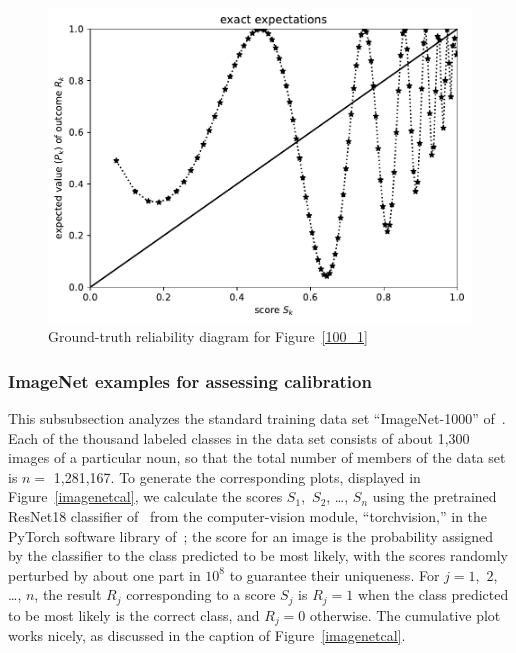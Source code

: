 \documentclass{article}
\begin{document}
\begin{figure}
\begin{centering}

\parbox{\imsize}{\includegraphics[width=\imsize]
                {./codes/unweighted/100_4_2_1/exact.pdf}}

\end{centering}
\caption{Ground-truth reliability diagram for Figure~\ref{100_1}}
\label{100_1e}
\end{figure}



\subsubsection{ImageNet examples for assessing calibration}
\label{aimagenetex}

This subsubsection analyzes the standard training data set ``ImageNet-1000''
of~\cite{imagenet}. Each of the thousand labeled classes in the data set
consists of about 1,300 images of a particular noun,
so that the total number of members of the data set is $n =$ 1,281,167.
To generate the corresponding plots, displayed in Figure~\ref{imagenetcal},
we calculate the scores $S_1$,~$S_2$, \dots, $S_n$
using the pretrained ResNet18 classifier of~\cite{he-zhang-ren-sun}
from the computer-vision module, ``torchvision,''
in the PyTorch software library of~\cite{pytorch};
the score for an image is the probability assigned by the classifier
to the class predicted to be most likely,
with the scores randomly perturbed by about one part in $10^8$ to guarantee
their uniqueness.
For $j = 1$,~$2$, \dots, $n$, the result $R_j$ corresponding to a score $S_j$
is $R_j = 1$ when the class predicted to be most likely is the correct class,
and $R_j = 0$ otherwise. The cumulative plot works nicely,
as discussed in the caption of Figure~\ref{imagenetcal}.
\end{document}
